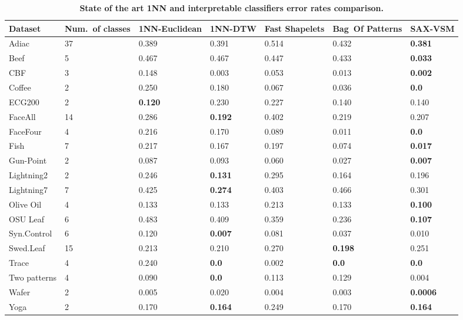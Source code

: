 \begin{table}[t!]
\caption{\bf State of the art 1NN and interpretable classifiers error rates comparison.}
 \label{perf_table1}
\centering
{\setlength{\extrarowheight}{1.5pt}%
{\footnotesize
\begin{tabularx}{\linewidth}{@{} l *6X @{}}
\hline
Dataset & \mbox{Num. of} classes & 1NN-Euclidean & 1NN-DTW & Fast Shapelets &  \mbox{Bag Of} \mbox{Patterns}
& SAX-VSM\\
\hline
Adiac        &37  & 0.389   & 0.391  & 0.514  & 0.432  & \textbf{0.381}\\
Beef         &5   & 0.467   & 0.467  & 0.447  & 0.433  & \textbf{0.033}\\
CBF         & 3  & 0.148    & 0.003  & 0.053    & 0.013 & \textbf{0.002} \\
Coffee       &2    & 0.250   & 0.180  & 0.067     & 0.036     & \textbf{0.0} \\
ECG200     &2   & \textbf{0.120}  & 0.230  & 0.227     & 0.140   & 0.140 \\
FaceAll      &14  & 0.286   & \textbf{0.192}  & 0.402     & 0.219   & 0.207\\
FaceFour    &4   & 0.216   & 0.170  & 0.089     & 0.011   & \textbf{0.0} \\
Fish         &7   & 0.217   & 0.167  & 0.197    & 0.074   & \textbf{0.017} \\
Gun-Point    &2   & 0.087   & 0.093  & 0.060     & 0.027     & \textbf{0.007} \\
Lightning2    &2   & 0.246   & \textbf{0.131}  & 0.295  & 0.164  & 0.196 \\
Lightning7    &7   & 0.425   & \textbf{0.274}  & 0.403  & 0.466  & 0.301 \\
Olive Oil     &4   & 0.133   & 0.133  & 0.213     & 0.133  & \textbf{0.100}\\
OSU Leaf    &6   & 0.483   & 0.409  & 0.359     & 0.236  & \textbf{0.107} \\
Syn.Control  &6   & 0.120   & \textbf{0.007}  & 0.081     & 0.037  & 0.010 \\
Swed.Leaf   &15  & 0.213   & 0.210 & 0.270 & \textbf{0.198} & 0.251 \\
Trace       &4   & 0.240   & \textbf{0.0}    & 0.002  & \textbf{0.0} & \textbf{0.0} \\
Two patterns &4   & 0.090   & \textbf{0.0}    & 0.113   & 0.129      & 0.004 \\
Wafer        &2    & 0.005   & 0.020     & 0.004  & 0.003 & \textbf{0.0006} \\
Yoga        &2    & 0.170   & \textbf{0.164}  & 0.249 & 0.170 & \textbf{0.164} \\
\hline
\end{tabularx}
}}
\end{table}

